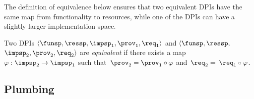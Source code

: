 The definition of equivalence below ensures that two equivalent DPIs
have the same map from functionality to resources, while one of the
DPIs can have a slightly larger implementation space.
\begin{definition}
  Two DPIs $\left\langle \funsp,\ressp,\impsp_{1},\prov_{1},\req_{1}\right\rangle $
  and $\langle\funsp,\ressp,$ $\impsp_{2},\prov_{2},\req_{2}\rangle$
  are \emph{equivalent} if there exists a map~$\varphi:\impsp_{2}\rightarrow\impsp_{1}$
  such that~$\prov_{2}=\prov_{1}\circ\varphi$ and~$\req_{2}=$ $\req_{1}\circ\varphi$.
\end{definition}

\subsection{Plumbing}

